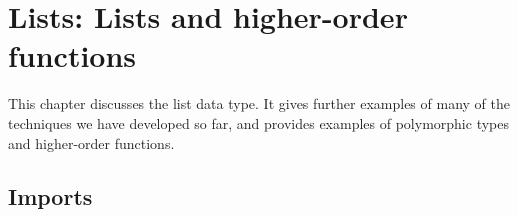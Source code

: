 \hypertarget{Lists}{%
\chapter{Lists: Lists and higher-order functions}\label{Lists}}

\begin{fence}
\begin{code}%
\>[0]\AgdaSpace{}%
\AgdaSpace{}%
\<%
\end{code}
\end{fence}

This chapter discusses the list data type. It gives further examples of
many of the techniques we have developed so far, and provides examples
of polymorphic types and higher-order functions.

\hypertarget{imports}{%
\section{Imports}\label{imports}}

